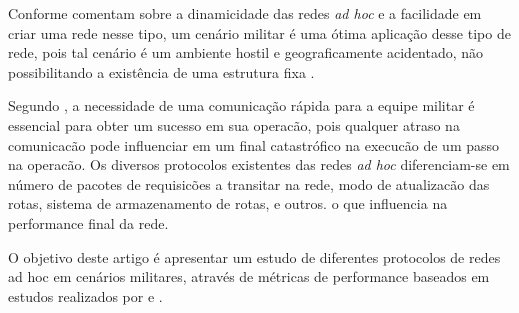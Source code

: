 Conforme \cite{pepe} comentam sobre a dinamicidade das redes \textit{ad hoc} e a facilidade em criar uma rede nesse tipo, um cen\'ario militar \'e uma \'otima aplica\c{c}\~ao desse tipo de rede, pois tal cen\'ario \'e um ambiente hostil e geograficamente acidentado, n\~ao possibilitando a exist\^encia de uma estrutura fixa \cite{schimidt}.

Segundo \cite{salles}, a necessidade de uma comunica\c{c}\~ao r\'apida para a equipe militar \'e essencial para obter um sucesso em sua operac\~ao, pois qualquer atraso na comunicac\~ao pode influenciar em um final catastr\'ofico na execuc\~ao de um passo na operac\~ao. Os diversos protocolos existentes das redes \textit{ad hoc} diferenciam-se em n\'umero de pacotes de requisic\~oes a transitar na rede, modo de atualizac\~ao das rotas, sistema de armazenamento de rotas, e outros. o que influencia na performance final da rede.

O objetivo deste artigo \'e apresentar um estudo de diferentes protocolos de redes ad hoc em cen\'arios militares, atrav\'es de m\'etricas de performance baseados em estudos realizados por \cite{pereira} e \cite{salles}.
